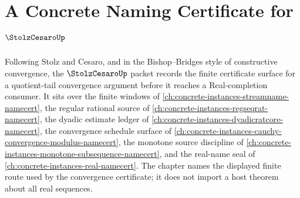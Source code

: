 \chapter{A Concrete Naming Certificate for $\StolzCesaroUp$}
\label{ch:concrete-instances-stolz-cesaro-namecert}

Following Stolz and Cesaro, and in the Bishop--Bridges style of constructive convergence, the $\StolzCesaroUp$ packet records the finite certificate surface for a quotient-tail convergence argument before it reaches a Real-completion consumer. It sits over the finite windows of \autoref{ch:concrete-instances-streamname-namecert}, the regular rational source of \autoref{ch:concrete-instances-regseqrat-namecert}, the dyadic estimate ledger of \autoref{ch:concrete-instances-dyadicratcore-namecert}, the convergence schedule surface of \autoref{ch:concrete-instances-cauchy-convergence-modulus-namecert}, the monotone source discipline of \autoref{ch:concrete-instances-monotone-subsequence-namecert}, and the real-name seal of \autoref{ch:concrete-instances-real-namecert}. The chapter names the displayed finite route used by the convergence certificate; it does not import a host theorem about all real sequences.

